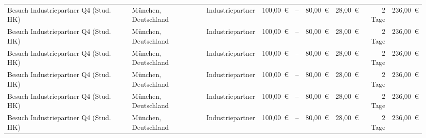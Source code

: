 \begin{table}[]
{\begin{tabular}{lllrrrrrr}
            Besuch Industriepartner Q4 (Stud. HK) & München, Deutschland & Industriepartner   & 100,00~€                                                     & --                                                      & 80,00~€                                                & 28,00~€                                                   & 2 Tage                                                 & 236,00~€                                                \\
            Besuch Industriepartner Q4 (Stud. HK) & München, Deutschland & Industriepartner   & 100,00~€                                                     & --                                                      & 80,00~€                                                & 28,00~€                                                   & 2 Tage                                                 & 236,00~€                                                \\
            Besuch Industriepartner Q4 (Stud. HK) & München, Deutschland & Industriepartner   & 100,00~€                                                     & --                                                      & 80,00~€                                                & 28,00~€                                                   & 2 Tage                                                 & 236,00~€                                                \\
            Besuch Industriepartner Q4 (Stud. HK) & München, Deutschland & Industriepartner   & 100,00~€                                                     & --                                                      & 80,00~€                                                & 28,00~€                                                   & 2 Tage                                                 & 236,00~€                                                \\
            Besuch Industriepartner Q4 (Stud. HK) & München, Deutschland & Industriepartner   & 100,00~€                                                     & --                                                      & 80,00~€                                                & 28,00~€                                                   & 2 Tage                                                 & 236,00~€                                                \\
            Besuch Industriepartner Q4 (Stud. HK) & München, Deutschland & Industriepartner   & 100,00~€                                                     & --                                                      & 80,00~€                                                & 28,00~€                                                   & 2 Tage                                                 & 236,00~€                                                \\

\end{tabular}}
\end{table}
